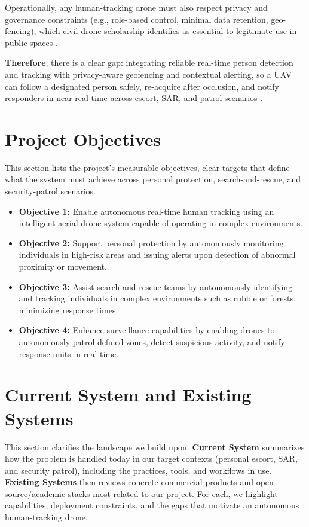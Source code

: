 \documentclass[12pt,a4paper]{report}
\begin{document}
Operationally, any human-tracking drone must also respect privacy and governance constraints (e.g., role-based control, minimal data retention, geo-fencing), which civil-drone scholarship identifies as essential to legitimate use in public spaces \citep{Finn2012InfoSoc}. 

\textbf{Therefore}, there is a clear gap: integrating reliable real-time person detection and tracking with privacy-aware geofencing and contextual alerting, so a \ac{UAV} can follow a designated person safely, re-acquire after occlusion, and notify responders in near real time across escort, \ac{SAR}, and patrol scenarios \citep{Mueller2016UAV123,Zhu2021VisDrone,Zhang2022ByteTrack}.



\section{Project Objectives}
\noindent
This section lists the project’s measurable objectives, clear targets that define what the system must achieve across personal protection, search-and-rescue, and security-patrol scenarios.

\begin{itemize}
    \item \textbf{Objective 1:} Enable autonomous real-time human tracking using an intelligent aerial drone system capable of operating in complex environments.
    \item \textbf{Objective 2:} Support personal protection by autonomously monitoring individuals in high-risk areas and issuing alerts upon detection of abnormal proximity or movement.
    \item \textbf{Objective 3:} Assist search and rescue teams by autonomously identifying and tracking individuals in complex environments such as rubble or forests, minimizing response times.
    \item \textbf{Objective 4:} Enhance surveillance capabilities by enabling drones to autonomously patrol defined zones, detect suspicious activity, and notify response units in real time.
\end{itemize}

\section{Current System and Existing Systems}

\noindent
This section clarifies the landscape we build upon. \textbf{Current System} summarizes how the problem is handled today in our target contexts (personal escort, \ac{SAR}, and security patrol), including the practices, tools, and workflows in use. \textbf{Existing Systems} then reviews concrete commercial products and open-source/academic stacks most related to our project. For each, we highlight capabilities, deployment constraints, and the gaps that motivate an autonomous human-tracking drone.
\end{document}
